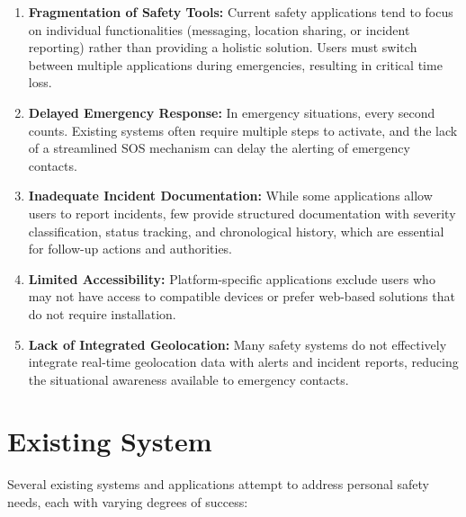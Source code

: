 \begin{enumerate}[label=\arabic*.]
  \item \textbf{Fragmentation of Safety Tools:} Current safety applications tend to focus on individual functionalities (messaging, location sharing, or incident reporting) rather than providing a holistic solution. Users must switch between multiple applications during emergencies, resulting in critical time loss.

  \item \textbf{Delayed Emergency Response:} In emergency situations, every second counts. Existing systems often require multiple steps to activate, and the lack of a streamlined SOS mechanism can delay the alerting of emergency contacts.

  \item \textbf{Inadequate Incident Documentation:} While some applications allow users to report incidents, few provide structured documentation with severity classification, status tracking, and chronological history, which are essential for follow-up actions and authorities.

  \item \textbf{Limited Accessibility:} Platform-specific applications exclude users who may not have access to compatible devices or prefer web-based solutions that do not require installation.

  \item \textbf{Lack of Integrated Geolocation:} Many safety systems do not effectively integrate real-time geolocation data with alerts and incident reports, reducing the situational awareness available to emergency contacts.
\end{enumerate}

\section{Existing System}

Several existing systems and applications attempt to address personal safety needs, each with varying degrees of success:


